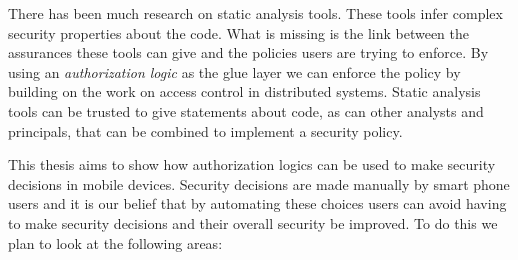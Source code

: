 \documentclass[a4paper,sfsidenotes]{tufte-book}
\begin{document}
There has been much research on static analysis tools.  These tools infer
complex security properties about the code.  What is missing is the link between
the assurances these tools can give and the policies users are trying to
enforce.  By using an \emph{authorization logic} as the glue layer we can
enforce the policy by building on the work on access control in distributed
systems.  Static analysis tools can be trusted to give statements about code, as
can other analysts and principals, that can be combined to implement a security
policy.

This thesis aims to show how authorization logics can be used to make
security decisions in mobile devices.  Security decisions are made
manually by smart phone users and it is our belief that by automating these
choices users can avoid having to make security decisions and their overall
security be improved.  To do this we plan to look at the following areas: 
\end{document}
